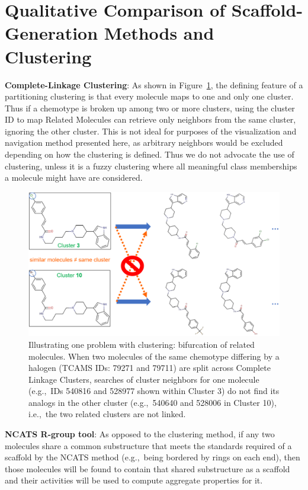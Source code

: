 \documentclass[11pt,letterpaper,biochem]{article}
\newcommand*\fref[1]{Figure~\ref{fig:#1}}
\newcommand*\eg{e.g.,~}
\newcommand*\ie{i.e.,~}
\begin{document}
\newpage 

\section{Qualitative Comparison of Scaffold-Generation Methods and Clustering}\label{sec:qualcomp}
{\bf Complete-Linkage Clustering}: As shown in \fref{clusterlanes}, the defining feature of a partitioning clustering is that every molecule maps to one and only one cluster. Thus if a chemotype is broken up among two or more clusters, using the cluster ID to map Related Molecules can retrieve only neighbors from the same cluster, ignoring the other cluster. This is not ideal for purposes of the visualization and navigation method presented here, as arbitrary neighbors would be excluded depending on how the clustering is defined.  Thus we do not advocate the use of clustering, unless it is a fuzzy clustering where all meaningful class memberships a molecule might have are considered. 

\begin{figure}
\includegraphics[width=6in]{../fig/clusterlanes_v3.png}
\caption{Illustrating one problem with clustering: bifurcation of related molecules.  When two molecules of the same chemotype differing by a halogen (TCAMS IDs: 79271 and 79711) are split across Complete Linkage Clusters, searches of cluster neighbors for one molecule (\eg IDs 540816 and 528977 shown within Cluster 3) do not find its analogs in the other cluster (\eg 540640 and 528006 in Cluster 10), \ie the two related clusters are not linked.}
\label{fig:clusterlanes}
\end{figure}



{\bf NCATS R-group tool}: As opposed to the clustering method, 
if any two molecules share a common substructure that meets the standards required of a scaffold by the NCATS method (\eg being bordered by rings on each end), then those molecules will be found to contain that shared substructure as a scaffold and their activities will be used to compute aggregate properties for it. 
\end{document}
